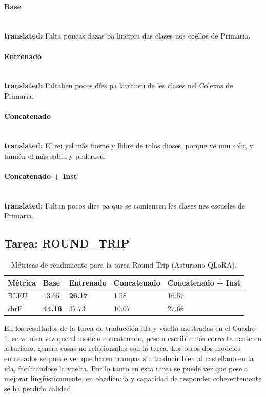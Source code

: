 \paragraph{Base}~\\
\textbf{translated:} Falta poucas dazas pa l\textquotesingle{}incipiu das clases nos coellos de Primaria.

\paragraph{Entrenado}~\\
\textbf{translated:} Faltaben pocos díes pa l\textquotesingle{}arrancu de les clases nel Colexos de Primaria.

\paragraph{Concatenado}~\\
\textbf{translated:} El rei ye\textquotesingle{}l más fuerte y llibre de tolos dioses, porque ye unu solu, y tamién el más sabiu y poderosu.

\paragraph{Concatenado + Inst}~\\
\textbf{translated:} Faltan pocos díes pa que se comiencen les clases nes escueles de Primaria.

\subsection{Tarea: ROUND\_TRIP}\label{tarea-round_trip}
\begin{longtable}[]{@{}lllll@{}}
\toprule\noalign{}
Métrica & Base & Entrenado & Concatenado & Concatenado + Inst \\
\midrule\noalign{}
\endhead
\bottomrule\noalign{}
\caption{Métricas de rendimiento para la tarea Round Trip (Asturiano QLoRA).}
\label{tab:metricas_round_trip_Asturiano QLoRA}
\endlastfoot
BLEU & 13.65 & \textbf{\underline{26.17}} & 1.58 & 16.57 \\
chrF & \textbf{\underline{44.16}} & 37.73 & 10.07 & 27.66 \\
\end{longtable}

En los resultados de la tarea de traducción ida y vuelta mostradas en el Cuadro \ref{tab:metricas_round_trip_Asturiano QLoRA}, se ve otra vez que el modelo concatenado, pese a escribir más correctamente en asturiano, genera cosas no relacionados con la tarea. Los otros dos modelos entrenados se puede ver que hacen trampas sin traducir bien al castellano en la ida, facilitandose la vuelta. Por lo tanto en esta tarea se puede ver que pese a mejorar lingüisticamente, en obediencia y capacidad de responder coherentemente se ha perdido calidad.

